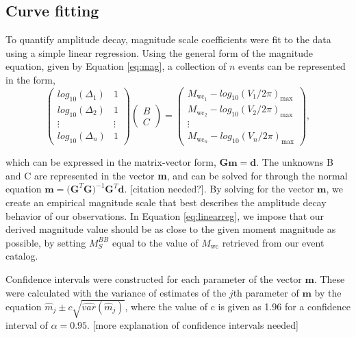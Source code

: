 \documentclass{gji}
\begin{document}
\subsection{Curve fitting}
To quantify amplitude decay, magnitude scale coefficients were fit to the data using a simple linear regression. Using the general form of the magnitude equation, given by Equation \ref{eq:mag}, a collection of $n$ events can be represented in the form, 
\begin{equation}
	\begin{pmatrix}
		log_{10}(\Delta_{1}) & 1 \\
		log_{10}(\Delta_{2}) & 1 \\
		\vdots  & \vdots \\
		log_{10}(\Delta_{n}) & 1 
	\end{pmatrix}
	\begin{pmatrix}
		{B}\\
		{C}
	\end{pmatrix}
	=
	\begin{pmatrix}
		M_{\text{wc}_1} - log_{10}({V_1}/{2\pi})_{\text{max}} \\
		M_{\text{wc}_2} - log_{10}({V_2}/{2\pi})_{\text{max}} \\
		\vdots  \\
		M_{\text{wc}_n} - log_{10}({V_n}/{2\pi})_{\text{max}}
	\end{pmatrix},
	\label{eq:linearreg}
\end{equation}

\noindent which can be expressed in the matrix-vector form, $\mathbf{Gm = d}$. The unknowns B and C are represented in the vector {\bfseries m}, and can be solved for through the normal equation $\mathbf{m} = \mathbf{(G}^{T}\mathbf{G})^{-1}\mathbf{G}^T\mathbf{d}$. [citation needed?]. By solving for the vector $\mathbf{m}$, we create an empirical magnitude scale that best describes the amplitude decay behavior of our observations. In Equation \ref{eq:linearreg}, we impose that our derived magnitude value should be as close to the given moment magnitude as possible, by setting $M_S^{BB}$ equal to the value of $M_\text{wc}$ retrieved from our event catalog. 

Confidence intervals were constructed for each parameter of the vector $\mathbf{m}$. These were calculated with the variance of estimates of the $j$th parameter of $\mathbf{m}$ by the equation $\hat{m}_j \pm c \sqrt{\hat{var}(\hat{m}_j)}$, where the value of c is given as 1.96 for a confidence interval of $\alpha = 0.95$. [more explanation of confidence intervals needed]
\end{document}
